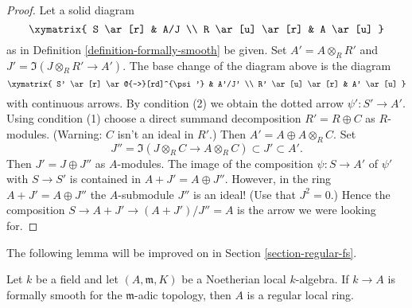 \begin{proof}
Let a solid diagram
$$
\xymatrix{
S \ar[r] & A/J \\
R \ar[u] \ar[r] & A \ar[u]
}
$$
as in Definition \ref{definition-formally-smooth} be given.
Set $A' = A \otimes_R R'$ and $J' = \Im(J \otimes_R R' \to A')$.
The base change of the diagram above is the diagram
$$
\xymatrix{
S' \ar[r] \ar@{-->}[rd]^{\psi'} & A'/J' \\
R' \ar[u] \ar[r] & A' \ar[u]
}
$$
with continuous arrows. By condition (2) we obtain the dotted arrow
$\psi' : S' \to A'$. Using condition (1) choose a direct summand decomposition
$R' = R \oplus C$ as $R$-modules. (Warning: $C$ isn't an ideal in $R'$.)
Then $A' = A \oplus A \otimes_R C$. Set
$$
J'' = \Im(J \otimes_R C \to A \otimes_R C) \subset J' \subset A'.
$$
Then $J' = J \oplus J''$ as $A$-modules. The image of the composition
$\psi : S \to A'$ of $\psi'$ with $S \to S'$ is contained in
$A + J' = A \oplus J''$. However, in the ring $A + J' = A \oplus J''$
the $A$-submodule $J''$ is an ideal! (Use that $J^2 = 0$.) Hence the
composition $S \to A + J' \to (A + J')/J'' = A$ is the arrow we were
looking for.
\end{proof}

\noindent
The following lemma will be improved on in
Section \ref{section-regular-fs}.

\begin{lemma}
\label{lemma-fs-implies-regular}
Let $k$ be a field and let $(A, \mathfrak m, K)$ be a Noetherian
local $k$-algebra. If $k \to A$ is formally smooth for the
$\mathfrak m$-adic topology, then $A$ is a regular local ring.
\end{lemma}

